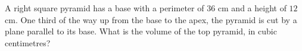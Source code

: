 A right square pyramid has a base with a perimeter of $36$ cm and a height of $12$ cm. One third of the way up from the base to the apex, the pyramid is cut by a plane parallel to its base. What is the volume of the top pyramid, in cubic centimetres?
